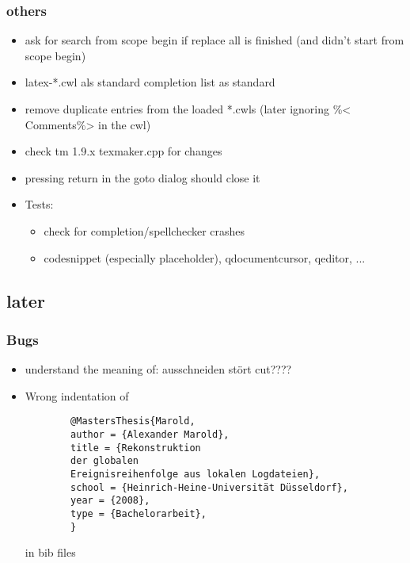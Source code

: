 \documentclass[10pt,a4paper,landscape]{report}
\begin{document}
\subsubsection{others}
\begin{itemize}
	\item ask for search from scope begin if replace all is finished (and didn't start from scope begin)
	\item latex-*.cwl als standard completion list as standard
	\item remove duplicate entries from the loaded *.cwls (later ignoring \%< Comments\%> in the cwl)
	\item check tm 1.9.x texmaker.cpp for changes
	\item pressing return in the goto dialog should close it
	\item Tests: \begin{itemize}
		\item check for completion/spellchecker crashes
		\item codesnippet (especially placeholder), qdocumentcursor, qeditor, ...
	\end{itemize}	
\end{itemize}


\subsection{later}

\subsubsection{Bugs}
\begin{itemize}
	\item understand the meaning of: ausschneiden stört cut????
	\item Wrong indentation of \begin{verbatim}
		@MastersThesis{Marold,
		author = {Alexander Marold},
		title = {Rekonstruktion 
		der globalen 
		Ereignisreihenfolge aus lokalen Logdateien},
		school = {Heinrich-Heine-Universität Düsseldorf},
		year = {2008},
		type = {Bachelorarbeit},
		}
	\end{verbatim} in bib files
\end{itemize} 
\end{document}
